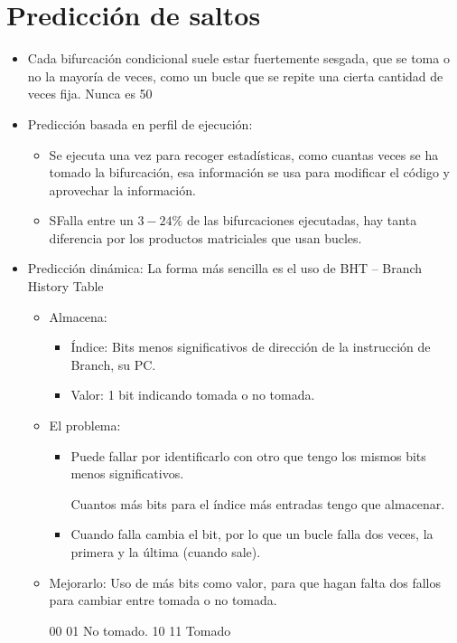 \documentclass[12pt, twoside, openright]{report} %
\begin{document}
\section{Predicción de saltos}

\begin{itemize}
\item Cada bifurcación condicional suele estar fuertemente sesgada, que se toma o no la mayoría de veces, como un bucle que se repite una cierta cantidad de veces fija. Nunca es 50%
\item Predicción basada en perfil de ejecución:
\begin{itemize}
  \item Se ejecuta una vez para recoger estadísticas, como cuantas veces se ha tomado la bifurcación, esa información se usa para modificar el código y aprovechar la información.
  \item SFalla entre un $3-24\%$ de las bifurcaciones ejecutadas, hay tanta diferencia por los productos matriciales que usan bucles.
\end{itemize}
    
\item Predicción dinámica: La forma más sencilla es el uso de BHT – Branch History Table
\begin{itemize}
  \item Almacena:
  \begin{itemize}
    \item Índice: Bits menos significativos de dirección de la instrucción de Branch, su PC.
    \item Valor: 1 bit indicando tomada o no tomada.
  \end{itemize}
  
  \item El problema:
  \begin{itemize}
    \item Puede fallar por identificarlo con otro que tengo los mismos bits menos significativos.
    
    Cuantos más bits para el índice más entradas tengo que almacenar.
    \item Cuando falla cambia el bit, por lo que un bucle falla dos veces, la primera y la última (cuando sale).
  \end{itemize}
  
  \item Mejorarlo: Uso de más bits como valor, para que hagan falta dos fallos para cambiar entre tomada o no tomada.
  
  00 01 No tomado. 10 11 Tomado
  

\end{itemize}
\end{itemize}
\end{document}
